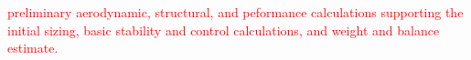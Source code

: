 \textcolor{red}{
preliminary aerodynamic, structural, and peformance calculations supporting the initial sizing, basic stability and control calculations, and weight and balance estimate.
}

